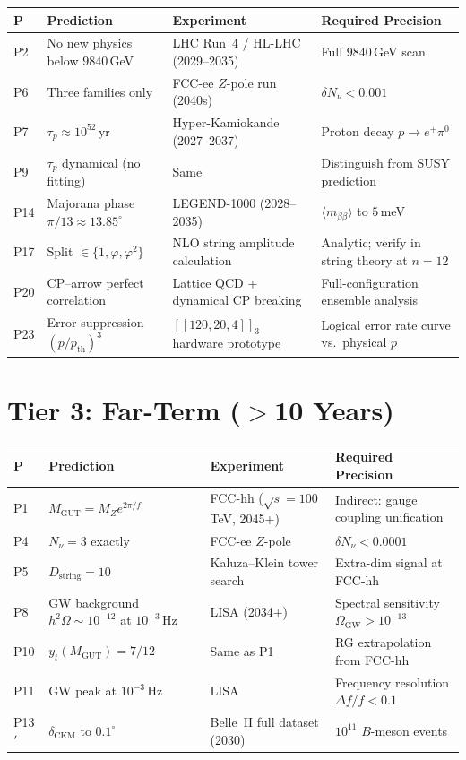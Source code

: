 \begin{longtable}{p{0.5cm}p{3.5cm}p{3cm}p{4cm}}
  \hline
  \textbf{P} & \textbf{Prediction} & \textbf{Experiment} &
  \textbf{Required Precision} \\
  \hline
  P2  & No new physics below $9840$\,GeV &
        LHC Run~4 / HL-LHC (2029--2035) & Full $9840$\,GeV scan \\
  P6  & Three families only &
        FCC-ee $Z$-pole run (2040s) & $\delta N_\nu < 0.001$ \\
  P7  & $\tau_p\approx10^{52}$\,yr &
        Hyper-Kamiokande (2027--2037) & Proton decay $p\to e^+\pi^0$ \\
  P9  & $\tau_p$ dynamical (no fitting) &
        Same & Distinguish from SUSY prediction \\
  P14 & Majorana phase $\pi/13\approx13.85^\circ$ &
        LEGEND-1000 (2028--2035) & $\langle m_{\beta\beta}\rangle$ to $5$\,meV \\
  P17 & Split $\in\{1,\varphi,\varphi^2\}$ &
        NLO string amplitude calculation &
        Analytic; verify in string theory at $n=12$ \\
  P20 & CP--arrow perfect correlation &
        Lattice QCD + dynamical CP breaking &
        Full-configuration ensemble analysis \\
  P23 & Error suppression $(p/p_{\mathrm{th}})^3$ &
        $[[120,20,4]]_3$ hardware prototype &
        Logical error rate curve vs.~physical $p$ \\
  \hline
\end{longtable}

\section{Tier 3: Far-Term ($>$10 Years)}
\label{sec:tier3}

\begin{longtable}{p{0.5cm}p{3.5cm}p{3cm}p{4cm}}
  \hline
  \textbf{P} & \textbf{Prediction} & \textbf{Experiment} &
  \textbf{Required Precision} \\
  \hline
  P1  & $M_{\mathrm{GUT}}=M_Ze^{2\pi/f}$ &
        FCC-hh ($\sqrt{s}=100$\,TeV, 2045+) &
        Indirect: gauge coupling unification \\
  P4  & $N_\nu=3$ exactly &
        FCC-ee $Z$-pole & $\delta N_\nu < 0.0001$ \\
  P5  & $D_\mathrm{string}=10$ &
        Kaluza--Klein tower search &
        Extra-dim signal at FCC-hh \\
  P8  & GW background $h^2\Omega\sim10^{-12}$ at $10^{-3}$\,Hz &
        LISA (2034+) & Spectral sensitivity $\Omega_{\mathrm{GW}}>10^{-13}$ \\
  P10 & $y_t(M_{\mathrm{GUT}})=7/12$ &
        Same as P1 & RG extrapolation from FCC-hh \\
  P11 & GW peak at $10^{-3}$\,Hz &
        LISA & Frequency resolution $\Delta f/f<0.1$ \\
  P13$'$ & $\delta_{\mathrm{CKM}}$ to $0.1^\circ$ &
        Belle~II full dataset (2030) &
        $10^{11}$ $B$-meson events \\
  \hline
\end{longtable}

